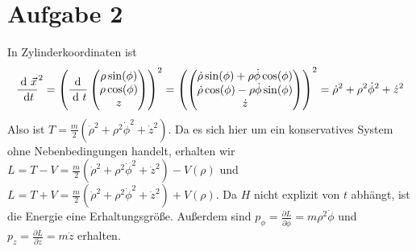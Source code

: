 \documentclass{article}
\theoremstyle{definition}
\begin{document}
\section*{Aufgabe 2}
In Zylinderkoordinaten ist
$$\frac{\d\  \vec x}{\d t}^2 = \left(\frac{\d \ }{\d\  t} \begin{pmatrix}
    \rho \sin(\phi)\\
    \rho \cos(\phi)\\
    z
\end{pmatrix}\right)^2 = \left(\begin{pmatrix}
    \dot \rho \sin(\phi) + \rho \dot \phi \cos(\phi)\\
    \dot \rho \cos(\phi) - \rho \dot \phi \sin(\phi)\\
    \dot z
\end{pmatrix}\right)^2 = \dot \rho^2 + \rho^2 \dot \phi^2 + \dot z^2$$
Also ist $T = \frac{m}{2} \left(\dot \rho^2 + \rho^2 \dot \phi^2 + \dot z^2\right)$. Da es sich hier um ein konservatives System ohne Nebenbedingungen handelt, erhalten wir $L = T - V = \frac{m}{2} \left(\dot \rho^2 + \rho^2 \dot \phi^2 + \dot z^2\right) - V(\rho)$ und $L = T + V = \frac{m}{2} \left(\dot \rho^2 + \rho^2 \dot \phi^2 + \dot z^2\right) + V(\rho)$. Da $H$ nicht explizit von $t$ abhängt, ist die Energie eine Erhaltungsgröße. Außerdem sind $p_\phi = \frac{\partial L}{\partial \dot \phi} = m \rho^2 \dot \phi$ und $p_z =  \frac{\partial L}{\partial \dot z} = m\dot z$ erhalten.
\end{document}
